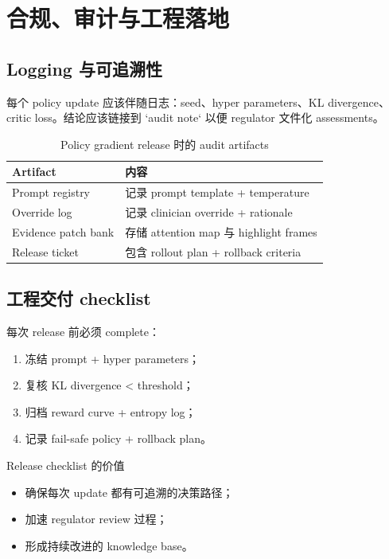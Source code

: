 \documentclass[a4paper]{article}
\begin{document}
\section{合规、审计与工程落地}
\subsection{Logging 与可追溯性}
每个 policy update 应该伴随日志：seed、hyper parameters、KL divergence、critic loss。结论应该链接到 `audit note` 以便 regulator 文件化 assessments。

\begin{table}[H]
\centering
\small
\begin{tabular}{p{}p{}}
\toprule
Artifact & 内容 \\
\midrule
Prompt registry & 记录 prompt template + temperature \\
Override log & 记录 clinician override + rationale \\
Evidence patch bank & 存储 attention map 与 highlight frames \\
Release ticket & 包含 rollout plan + rollback criteria \\
\bottomrule
\end{tabular}
\caption{Policy gradient release 时的 audit artifacts}
\end{table}

\subsection{工程交付 checklist}
每次 release 前必须 complete：
\begin{enumerate}
    \item 冻结 prompt + hyper parameters；
    \item 复核 KL divergence < threshold；
    \item 归档 reward curve + entropy log；
    \item 记录 fail-safe policy + rollback plan。
\end{enumerate}

\begin{importantbox}{Release checklist 的价值}
\begin{itemize}
    \item 确保每次 update 都有可追溯的决策路径；
    \item 加速 regulator review 过程；
    \item 形成持续改进的 knowledge base。
\end{itemize}
\end{importantbox}
\end{document}
